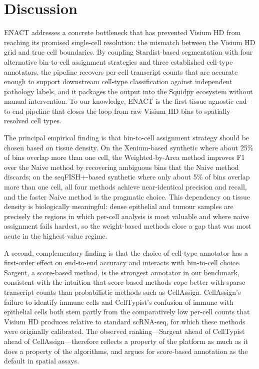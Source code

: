 \documentclass[11pt]{article}
\begin{document}
\section{Discussion}

ENACT addresses a concrete bottleneck that has prevented Visium HD from reaching its promised single-cell resolution: the mismatch between the Visium HD grid and true cell boundaries. By coupling Stardist-based segmentation with four alternative bin-to-cell assignment strategies and three established cell-type annotators, the pipeline recovers per-cell transcript counts that are accurate enough to support downstream cell-type classification against independent pathology labels, and it packages the output into the Squidpy ecosystem without manual intervention. To our knowledge, ENACT is the first tissue-agnostic end-to-end pipeline that closes the loop from raw Visium HD bins to spatially-resolved cell types.

The principal empirical finding is that bin-to-cell assignment strategy should be chosen based on tissue density. On the Xenium-based synthetic where about 25\% of bins overlap more than one cell, the Weighted-by-Area method improves F1 over the Naive method by recovering ambiguous bins that the Naive method discards; on the seqFISH+-based synthetic where only about 5\% of bins overlap more than one cell, all four methods achieve near-identical precision and recall, and the faster Naive method is the pragmatic choice. This dependency on tissue density is biologically meaningful: dense epithelial and tumour samples are precisely the regions in which per-cell analysis is most valuable and where naive assignment fails hardest, so the weight-based methods close a gap that was most acute in the highest-value regime.

A second, complementary finding is that the choice of cell-type annotator has a first-order effect on end-to-end accuracy and interacts with bin-to-cell choice. Sargent, a score-based method, is the strongest annotator in our benchmark, consistent with the intuition that score-based methods cope better with sparse transcript counts than probabilistic methods such as CellAssign. CellAssign's failure to identify immune cells and CellTypist's confusion of immune with epithelial cells both stem partly from the comparatively low per-cell counts that Visium HD produces relative to standard scRNA-seq, for which these methods were originally calibrated. The observed ranking---Sargent ahead of CellTypist ahead of CellAssign---therefore reflects a property of the platform as much as it does a property of the algorithms, and argues for score-based annotation as the default in spatial assays.
\end{document}
